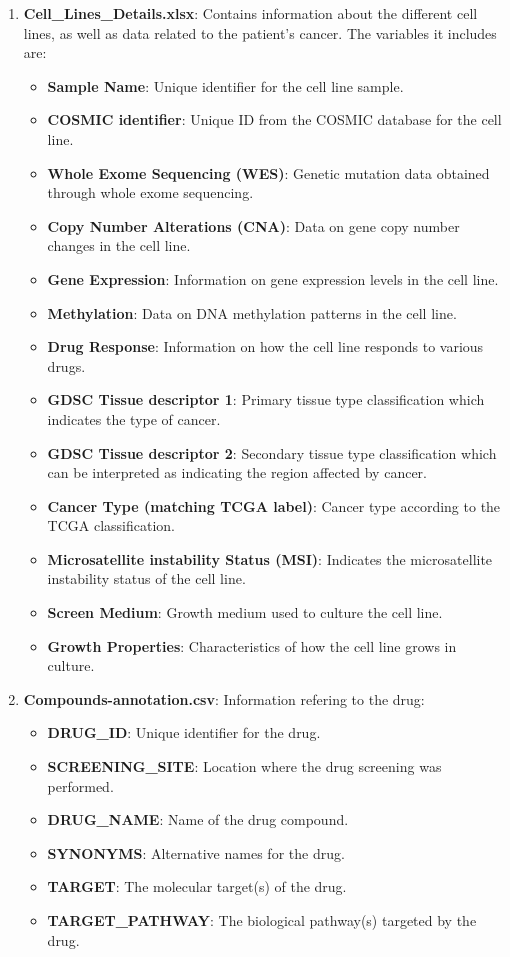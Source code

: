 \begin{enumerate}
      \item \textbf{Cell\_Lines\_Details.xlsx}: Contains information about the different cell lines, as well as data related to the patient's cancer. The variables it includes are:
      \begin{itemize}
        \item \textbf{Sample Name}: Unique identifier for the cell line sample.
        \item \textbf{COSMIC identifier}: Unique ID from the COSMIC database for the cell line.
        \item \textbf{Whole Exome Sequencing (WES)}: Genetic mutation data obtained through whole exome sequencing.
        \item \textbf{Copy Number Alterations (CNA)}: Data on gene copy number changes in the cell line.
        \item \textbf{Gene Expression}: Information on gene expression levels in the cell line.
        \item \textbf{Methylation}: Data on DNA methylation patterns in the cell line.
        \item \textbf{Drug Response}: Information on how the cell line responds to various drugs.
        \item \textbf{GDSC Tissue descriptor 1}: Primary tissue type classification which indicates the type of cancer.
        \item \textbf{GDSC Tissue descriptor 2}: Secondary tissue type classification which can be interpreted as indicating the region affected by cancer.
        \item \textbf{Cancer Type (matching TCGA label)}: Cancer type according to the TCGA classification.
        \item \textbf{Microsatellite instability Status (MSI)}: Indicates the microsatellite instability status of the cell line.
        \item \textbf{Screen Medium}: Growth medium used to culture the cell line.
        \item \textbf{Growth Properties}: Characteristics of how the cell line grows in culture.
        \end{itemize}

    \item \textbf{Compounds-annotation.csv}: Information refering to the drug:
        \begin{itemize}
            \item \textbf{DRUG\_ID}: Unique identifier for the drug.
            \item \textbf{SCREENING\_SITE}: Location where the drug screening was performed.
            \item \textbf{DRUG\_NAME}: Name of the drug compound.
            \item \textbf{SYNONYMS}: Alternative names for the drug.
            \item \textbf{TARGET}: The molecular target(s) of the drug.
            \item \textbf{TARGET\_PATHWAY}: The biological pathway(s) targeted by the drug.
        \end{itemize}


\end{enumerate}
